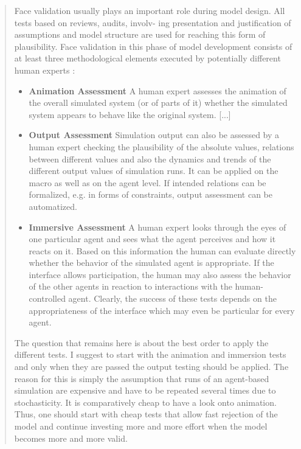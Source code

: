 \begin{quotation}
\og Face validation usually plays an important role during
model design. All tests based on reviews, audits, involv-
ing presentation and justification of assumptions and model
structure are used for reaching this form of plausibility. Face
validation in this phase of model development consists of at
least three methodological elements executed by potentially
different human experts :
\begin{itemize}
	\item \textbf{Animation Assessment} A human expert assesses the animation of the overall simulated system (or of parts of it) whether the simulated system appears to behave like the original system. [...]
	\item \textbf{Output Assessment} Simulation output can also be assessed by a human expert checking the plausibility of the absolute values, relations between different values and also the dynamics and trends of the different output values of simulation runs. It can be applied on the macro as well as on the agent level. If intended relations can be formalized, e.g. in forms of constraints, output assessment can be automatized.
	\item \textbf{Immersive Assessment} A human expert looks through the eyes of one particular agent and sees what the agent perceives and how it reacts on it. Based on this information the human can evaluate directly whether the behavior of the simulated agent is appropriate. If the interface allows participation, the human may also assess the behavior of the other agents in reaction to interactions with the human-controlled agent. Clearly, the success of these tests depends on the appropriateness of the interface which may even be particular for every agent.
\end{itemize}
The question that remains here is about the best order to apply the different tests. I suggest to start with the animation and immersion tests and only when they are passed the output testing should be applied. The reason for this is simply the assumption that runs of an agent-based simulation are expensive and have to be repeated several times due to stochasticity. It is comparatively cheap to have a look onto animation. Thus, one should start with cheap tests that allow fast rejection of the model and continue investing more and more effort when the model becomes more and more valid.\fg{}
\mbox{}~ \hfill \cite[41-42]{klugl_validation_2008}
\end{quotation}


